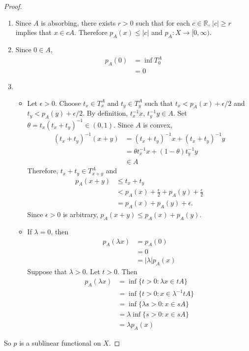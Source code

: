 \documentclass[12pt]{amsart}
\theoremstyle{definition}
\newcommand{\lam}{\lambda}
\newcommand{\ep}{\epsilon}
\newcommand{\R}{\mathbb{R}}
\newcommand{\Rg}{[0,\infty)}
\begin{document}
	\begin{proof}\
		\begin{enumerate}
			\item Since $A$ is absorbing, there exists $r >0$ such that for each $c \in \R$, $|c| \geq r$ implies that $x \in cA$. Therefore $p_A(x) \leq |c|$ and $p_A: X \rightarrow \Rg$.
			\item Since $0 \in A$, 
			\begin{align*}
				p_A(0) 
				&= \inf T^A_0 \\
				&= 0
			\end{align*}
			\item \begin{itemize}
				\item Let $\ep >0$. Choose $t_x \in T^A_x$ and $t_y \in T^A_y$ such that $t_x < p_A(x) + \ep/2$ and $t_y < p_A(y) + \ep/2$. By definition, $t_x^{-1}x$, $t_y^{-1}y \in A$. Set $\theta = t_x(t_x +t_y)^{-1} \in (0, 1)$. Since $A$ is convex, 
				\begin{align*}
					(t_x +t_y)^{-1}(x+y) 
					&= (t_x +t_y)^{-1}x + (t_x +t_y)^{-1}y \\
					&= \theta t_x^{-1}x + (1 - \theta)t_y^{-1}y \\
					& \in A
				\end{align*}
				Therefore, $t_x + t_y \in T^A_{x+y}$ and 
				\begin{align*}
					p_A(x+y) 
					& \leq t_x + t_y \\
					& < p_A(x) + \frac{\ep}{2} + p_A(y) + \frac{\ep}{2} \\
					& = p_A(x) + p_A(y) + \ep.
				\end{align*}
				Since $\ep >0$ is arbitrary, $p_A(x+y) \leq p_A(x) + p_A(y)$.
				\item If $\lam =0$, then 
				\begin{align*}
					p_A(\lam x) 
					&= p_A(0) \\
					&= 0 \\
					&= |\lam| p_A(x)
				\end{align*}
				Suppose that $\lam > 0$. Let $t >0$. Then
				\begin{align*}
					p_A(\lam x) 
					&= \inf \{t > 0: \lam x \in tA\} \\
					&= \inf \{t > 0: x \in \lam^{-1} tA\} \\
					&= \inf \{\lam s > 0: x \in sA\} \\
					&= \lam \inf \{ s > 0: x \in sA\} \\
					&= \lam p_A(x)
				\end{align*}
			\end{itemize}
		\end{enumerate}
		So $p$ is a sublinear functional on $X$. 
	\end{proof}
\end{document}
